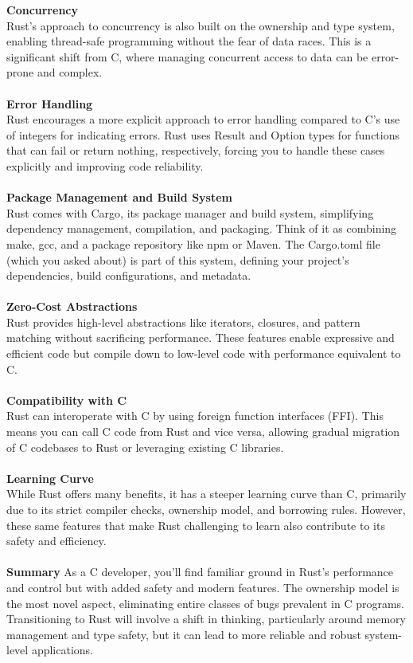 \noindent\textbf{Concurrency}\\
Rust’s approach to concurrency is also built on the ownership and type system, enabling thread-safe programming without the fear of data races. This is a significant shift from C, where managing concurrent access to data can be error-prone and complex.\\
\\
\textbf{Error Handling}\\
Rust encourages a more explicit approach to error handling compared to C's use of integers for indicating errors. Rust uses Result and Option types for functions that can fail or return nothing, respectively, forcing you to handle these cases explicitly and improving code reliability.\\
\\
\textbf{Package Management and Build System} \\
Rust comes with Cargo, its package manager and build system, simplifying dependency management, compilation, and packaging. Think of it as combining make, gcc, and a package repository like npm or Maven. The Cargo.toml file (which you asked about) is part of this system, defining your project's dependencies, build configurations, and metadata.\\
\\
\textbf{Zero-Cost Abstractions}\\
Rust provides high-level abstractions like iterators, closures, and pattern matching without sacrificing performance. These features enable expressive and efficient code but compile down to low-level code with performance equivalent to C.\\
\\
\textbf{Compatibility with C}\\
Rust can interoperate with C by using foreign function interfaces (FFI). This means you can call C code from Rust and vice versa, allowing gradual migration of C codebases to Rust or leveraging existing C libraries.\\
\\
\textbf{Learning Curve}\\
While Rust offers many benefits, it has a steeper learning curve than C, primarily due to its strict compiler checks, ownership model, and borrowing rules. However, these same features that make Rust challenging to learn also contribute to its safety and efficiency.\\
\\
\textbf{Summary}
As a C developer, you'll find familiar ground in Rust's performance and control but with added safety and modern features. The ownership model is the most novel aspect, eliminating entire classes of bugs prevalent in C programs. Transitioning to Rust will involve a shift in thinking, particularly around memory management and type safety, but it can lead to more reliable and robust system-level applications.


